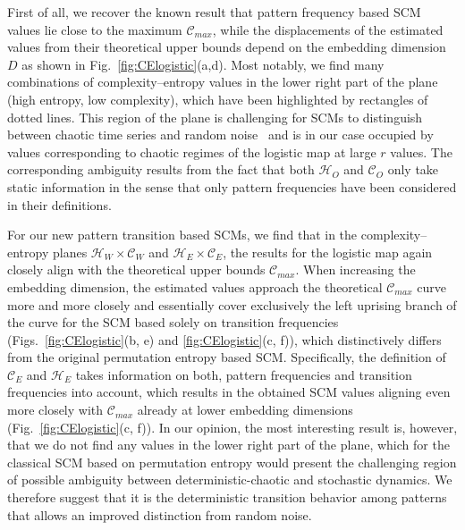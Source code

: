 \documentclass[12pt,aip,cha,reprint,nofootinbib]{revtex4-1}
\begin{document}
First of all, we recover the known result that pattern frequency based SCM values lie close to the maximum $\mathcal{C}_{max}$, while the displacements of the estimated values from their theoretical upper bounds depend on the embedding dimension $D$ as shown in Fig.~\ref{fig:CElogistic}(a,d). Most notably, we find many combinations of complexity--entropy values in the lower right part of the plane (high entropy, low complexity), which have been highlighted by rectangles of dotted lines. This region of the plane is challenging for SCMs to distinguish between chaotic time series and random noise~\cite{BorgesAMC2019} and is in our case occupied by values corresponding to chaotic regimes of the logistic map at large $r$ values. The corresponding ambiguity results from the fact that both $\mathcal{H}_O$ and $\mathcal{C}_O$ only take static information in the sense that only pattern frequencies have been considered in their definitions. 

For our new pattern transition based SCMs, we find that in the complexity--entropy planes $\mathcal{H}_W \times \mathcal{C}_W$ and $\mathcal{H}_E \times \mathcal{C}_E$, the results for the logistic map again closely align with the theoretical upper bounds $\mathcal{C}_{max}$. When increasing the embedding dimension, the estimated values approach the theoretical $\mathcal{C}_{max}$ curve more and more closely and essentially cover exclusively the left uprising branch of the curve for the SCM based solely on transition frequencies (Figs.~\ref{fig:CElogistic}(b, e) and \ref{fig:CElogistic}(c, f)), which distinctively differs from the original permutation entropy based SCM. Specifically, the definition of $\mathcal{C}_{E}$ and $\mathcal{H}_{E}$ takes information on both, pattern frequencies and transition frequencies into account, which results in the obtained SCM values aligning even more closely with $\mathcal{C}_{max}$ already at lower embedding dimensions (Fig.~\ref{fig:CElogistic}(c, f)). In our opinion, the most interesting result is, however, that we do not find any values in the lower right part of the plane, which for the classical SCM based on permutation entropy would present the challenging region of possible ambiguity between deterministic-chaotic and stochastic dynamics. We therefore suggest that it is the deterministic transition behavior among patterns that allows an improved distinction from random noise. 
\end{document}
